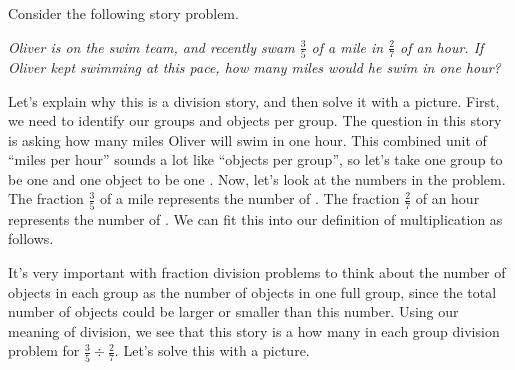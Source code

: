 \documentclass{ximera}
\begin{document}
\begin{example}
Consider the following story problem.

\emph{Oliver is on the swim team, and recently swam $\frac{3}{5}$ of a mile in $\frac{2}{7}$ of an hour. If Oliver kept swimming at this pace, how many miles would he swim in one hour?} 

Let's explain why this is a division story, and then solve it with a picture. First, we need to identify our groups and objects per group. The question in this story is asking how many miles Oliver will swim in one hour. This combined unit of ``miles per hour'' sounds a lot like ``objects per group'', so let's take one group to be one  and one object to be one  . Now, let's look at the numbers in the problem. The fraction $\frac{3}{5}$ of a mile represents the number of . The fraction $\frac{2}{7}$ of an hour represents the number of . We can fit this into our definition of multiplication as follows.

\begin{image}
\end{image}


It's very important with fraction division problems to think about the number of objects in each group as the number of objects in one full group, since the total number of objects could be larger or smaller than this number. Using our meaning of division, we see that this story is a how many in each group division problem for $\frac{3}{5} \div \frac{2}{7}$. Let's solve this with a picture.


\end{example}
\end{document}
